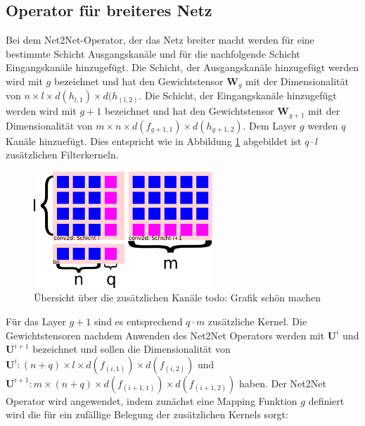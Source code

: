 \subsection{Operator für breiteres Netz}
Bei dem Net2Net-Operator, der das Netz breiter macht werden für eine bestimmte Schicht Ausgangskanäle und für die nachfolgende Schicht Eingangskanäle hinzugefügt. Die Schicht, der Ausgangskanäle hinzugefügt werden wird mit $g$ bezeichnet und hat den Gewichtstensor $\mathbf{W}_g$ mit der Dimensionalität von $n \times l \times d(h_{l,1}) \times d(h_{(l,2)}$. Die Schicht, der Eingangskanäle hinzugefügt werden wird mit $g+1$ bezeichnet und hat den Gewichtstensor $\mathbf{W}_{g+1}$ mit der Dimensionalität von $m \times n \times d(f_{g+1,1}) \times d(h_{g+1,2})$. Dem Layer $g$ werden $q$ Kanäle hinzuefügt. Dies entspricht wie in Abbildung \ref{abb:channels} abgebildet ist $q \cdot l $ zusätzlichen Filterkerneln. 
\begin{figure}[h]
 \centering
 \includegraphics[width=0.6\textwidth]{KapitelPartA/images/channels.png}
 \caption{Übersicht über die zusätzlichen Kanäle todo: Grafik schön machen}
\label{abb:channels}
 \end{figure}



Für das Layer $g+1$ sind es entsprechend $q \cdot m $ zusätzliche Kernel. Die Gewichtstensoren nachdem Anwenden des Net2Net Operators werden mit $\mathbf{U}^i$ und $\mathbf{U}^{i+1}$ bezeichnet und sollen die Dimensionalität von $\mathbf{U}^i: (n+q) \times l \times d(f_{(i,1)}) \times d(f_{(i,2)})$ und $\mathbf{U}^{i+1}: m \times (n+q) \times d(f_{(i+1,1)}) \times d(f_{(i+1,2)})$ haben. Der Net2Net Operator wird angewendet, indem zunächst eine Mapping Funktion $g$ definiert wird die für ein zufällige Belegung der zusätzlichen Kernels sorgt:

